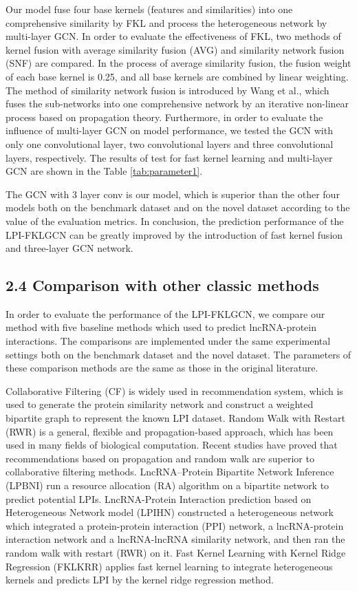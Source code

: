 \documentclass[fleqn,10pt]{wlscirep}
\begin{document}
Our model fuse four base kernels (features and similarities) into one comprehensive similarity by FKL and process the heterogeneous network by multi-layer GCN. In order to evaluate the effectiveness of FKL, two methods of kernel fusion with average similarity fusion (AVG) and similarity network fusion (SNF) are compared. In the process of average similarity fusion, the fusion weight of each base kernel is 0.25, and all base kernels are combined by linear weighting. The method of similarity network fusion is introduced by Wang et al.\cite{Wang2014}, which fuses the sub-networks into one comprehensive network by an iterative non-linear process based on propagation theory. Furthermore, in order to evaluate the influence of multi-layer GCN on model performance, we tested the GCN with only one convolutional layer, two convolutional layers and three convolutional layers, respectively. The results of test for fast kernel learning and multi-layer GCN are shown in the Table \ref{tab:parameter1}. 

The GCN with 3 layer conv is our model, which is superior than the other four models both on the benchmark dataset and on the novel dataset according to the value of the evaluation metrics. In conclusion, the prediction performance of the LPI-FKLGCN can be greatly improved by the introduction of fast kernel fusion and three-layer GCN network.

\subsection*{2.4 Comparison with other classic methods}
In order to evaluate the performance of the LPI-FKLGCN, we compare our method with five baseline methods which used to predict lncRNA-protein interactions. The comparisons are implemented under the same experimental settings both on the benchmark dataset and the novel dataset. The parameters of these comparison methods are the same as those in the original literature. 

Collaborative Filtering (CF)\cite{Sarwar2001} is widely used in recommendation system, which is used to generate the protein similarity network and construct a weighted bipartite graph to represent the known LPI dataset. Random Walk with Restart (RWR)\cite{Gan2014} is a general, flexible and propagation-based approach, which has been used in many fields of biological computation. Recent studies have proved that recommendations based on propagation and random walk are superior to collaborative filtering methods. LncRNA–Protein Bipartite Network Inference (LPBNI)\cite{Ge2016} run a resource allocation (RA) algorithm on a bipartite network to predict potential LPIs. LncRNA-Protein Interaction prediction based on Heterogeneous Network model (LPIHN)\cite{Li2015a} constructed a heterogeneous network which integrated a protein-protein interaction (PPI) network, a lncRNA-protein interaction network and a lncRNA-lncRNA similarity network, and then ran the random walk with restart (RWR) on it. Fast Kernel Learning with Kernel Ridge Regression (FKLKRR)\cite{Shen2019} applies fast kernel learning to integrate heterogeneous kernels and predicts LPI by the kernel ridge regression method.
\end{document}
